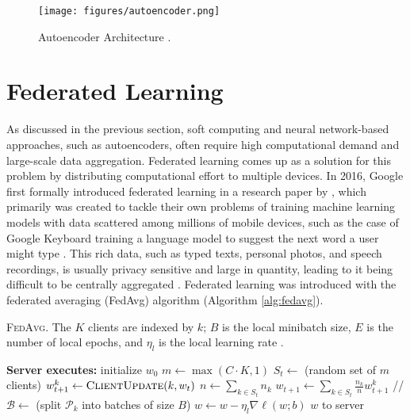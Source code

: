 \begin{figure}[h]
    \centering
    \texttt{[image: figures/autoencoder.png]}
    \caption{Autoencoder Architecture \citep{ibm-autoencoder}.}
    \label{fig:autoencoder_architecture}
\end{figure}

\section{Federated Learning}

As discussed in the previous section, soft computing and neural network-based approaches, such as autoencoders, often require high computational demand and large-scale data aggregation. Federated learning comes up as a solution for this problem by distributing computational effort to multiple devices. In 2016, Google first formally introduced federated learning in a research paper by \cite{mcmahan2023communication}, which primarily was created to tackle their own problems of training machine learning models with data scattered among millions of mobile devices, such as the case of Google Keyboard training a language model to suggest the next word a user might type \citep{47586}. This rich data, such as typed texts, personal photos, and speech recordings, is usually privacy sensitive and large in quantity, leading to it being difficult to be centrally aggregated \citep{mcmahan2023communication}. Federated learning was introduced with the federated averaging (FedAvg) algorithm (Algorithm \ref{alg:fedavg}).

\begin{algorithm}
\caption{\textsc{FedAvg}. The $K$ clients are indexed by $k$; $B$ is the local minibatch size, $E$ is the number of local epochs, and $\eta_l$ is the local learning rate \citep{mcmahan2023communication}.}
\label{alg:fedavg}
\begin{algorithmic}[1]
\State \textbf{Server executes:}
\State initialize $w_0$
    \State $m \gets \max(C \cdot K, 1)$
    \State $S_t \gets$ (random set of $m$ clients)
        \State $w^{k}_{t+1} \gets \textsc{ClientUpdate}(k, w_t)$
    \EndFor
    \State $n \gets \sum_{k \in S_t} n_k$
    \State $w_{t+1} \gets \sum_{k \in S_t} \frac{n_k}{n} w^{k}_{t+1}$
\EndFor
\Statex
{} \quad // 
    \State $\mathcal{B} \gets$ (split $\mathcal{P}_k$ into batches of size $B$)
            \State $w \gets w - \eta_l \nabla \ell(w; b)$
        \EndFor
    \EndFor
    \State \Return $w$ to server
\EndFunction
\end{algorithmic}
\end{algorithm}

